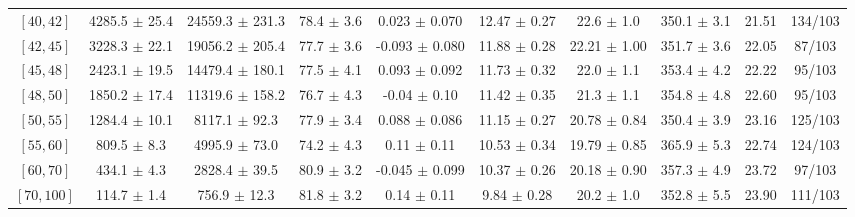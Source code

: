\begin{tabular}{c||c|c|c|c|c|c|c||c|c}
$[40, 42]$ & 4285.5 $\pm$ 25.4 & 24559.3 $\pm$ 231.3 & 78.4 $\pm$ 3.6 & 0.023 $\pm$ 0.070 & 12.47 $\pm$ 0.27 & 22.6 $\pm$ 1.0 & 350.1 $\pm$ 3.1 & 21.51 & 134/103\\
$[42, 45]$ & 3228.3 $\pm$ 22.1 & 19056.2 $\pm$ 205.4 & 77.7 $\pm$ 3.6 & -0.093 $\pm$ 0.080 & 11.88 $\pm$ 0.28 & 22.21 $\pm$ 1.00 & 351.7 $\pm$ 3.6 & 22.05 & 87/103\\
$[45, 48]$ & 2423.1 $\pm$ 19.5 & 14479.4 $\pm$ 180.1 & 77.5 $\pm$ 4.1 & 0.093 $\pm$ 0.092 & 11.73 $\pm$ 0.32 & 22.0 $\pm$ 1.1 & 353.4 $\pm$ 4.2 & 22.22 & 95/103\\
$[48, 50]$ & 1850.2 $\pm$ 17.4 & 11319.6 $\pm$ 158.2 & 76.7 $\pm$ 4.3 & -0.04 $\pm$ 0.10 & 11.42 $\pm$ 0.35 & 21.3 $\pm$ 1.1 & 354.8 $\pm$ 4.8 & 22.60 & 95/103\\
$[50, 55]$ & 1284.4 $\pm$ 10.1 & 8117.1 $\pm$ 92.3 & 77.9 $\pm$ 3.4 & 0.088 $\pm$ 0.086 & 11.15 $\pm$ 0.27 & 20.78 $\pm$ 0.84 & 350.4 $\pm$ 3.9 & 23.16 & 125/103\\
$[55, 60]$ & 809.5 $\pm$ 8.3 & 4995.9 $\pm$ 73.0 & 74.2 $\pm$ 4.3 & 0.11 $\pm$ 0.11 & 10.53 $\pm$ 0.34 & 19.79 $\pm$ 0.85 & 365.9 $\pm$ 5.3 & 22.74 & 124/103\\
$[60, 70]$ & 434.1 $\pm$ 4.3 & 2828.4 $\pm$ 39.5 & 80.9 $\pm$ 3.2 & -0.045 $\pm$ 0.099 & 10.37 $\pm$ 0.26 & 20.18 $\pm$ 0.90 & 357.3 $\pm$ 4.9 & 23.72 & 97/103\\
$[70, 100]$ & 114.7 $\pm$ 1.4 & 756.9 $\pm$ 12.3 & 81.8 $\pm$ 3.2 & 0.14 $\pm$ 0.11 & 9.84 $\pm$ 0.28 & 20.2 $\pm$ 1.0 & 352.8 $\pm$ 5.5 & 23.90 & 111/103\\
\end{tabular}
